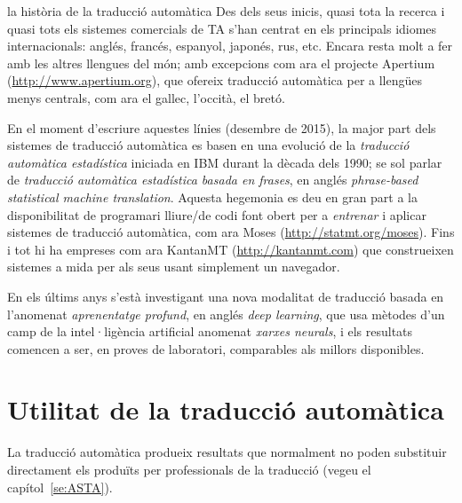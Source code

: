 \begin{persabermes}{la història de la traducció automàtica}
Des dels seus inicis, quasi tota la recerca i quasi tots els sistemes
comercials de TA s'han centrat en els principals idiomes
internacionals: anglés, francés, espanyol, japonés, rus, etc.  Encara
resta molt a fer amb les altres llengues del món; amb excepcions com
ara el projecte Apertium (\url{http://www.apertium.org}), que ofereix
traducció automàtica per a llengües menys centrals, com ara el gallec,
l'occità, el bretó.

En el moment d'escriure aquestes línies (desembre de 2015), la major
part dels sistemes de traducció automàtica es basen en una evolució de
la \emph{traducció automàtica estadística} iniciada en IBM durant la
dècada dels 1990; se sol parlar de \emph{traducció automàtica
  estadística basada en frases}, en anglés \emph{phrase-based
  statistical machine translation}. Aquesta hegemonia es deu en gran
part a la disponibilitat de programari lliure/de codi font obert per a
\emph{entrenar} i aplicar sistemes de traducció automàtica, com ara
Moses (\url{http://statmt.org/moses}). Fins i tot hi ha empreses com
ara KantanMT (\url{http://kantanmt.com}) que construeixen sistemes a
mida per als seus usant simplement un navegador.

En els últims anys s'està investigant una nova modalitat de traducció
basada en l'anomenat \emph{aprenentatge profund}, en anglés \emph{deep
  learning}, que usa mètodes d'un camp de la intel·ligència artificial
anomenat \emph{xarxes neurals}, i els resultats comencen a ser, en
proves de laboratori, comparables als millors disponibles.

\mbox{}%


\end{persabermes}


\section{Utilitat de la traducció automàtica}
\label{ss:UTA}

La traducció automàtica produeix resultats que normalment no poden
substituir directament els produïts per professionals de la traducció
(vegeu el capítol~\ref{se:ASTA}).


